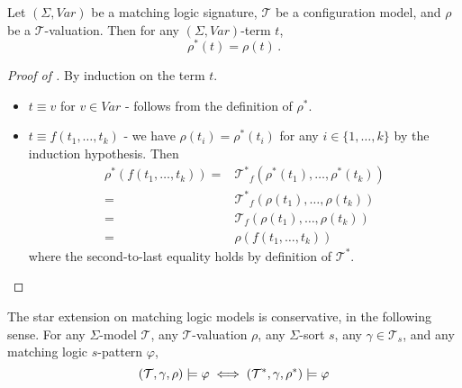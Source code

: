 \begin{lemma}\label{lem:rhoStarOfTerm}
    Let $(\Sigma, \mathit{Var})$ be a matching logic signature, $\mathcal{T}$ be a configuration model,
    and $\rho$ be a $\mathcal{T}$-valuation. Then for any $(\Sigma, \mathit{Var})$-term $t$,
    \begin{equation}
        \rho^*(t) = \rho(t) \, .
    \end{equation}
\end{lemma}

\begin{proof}[Proof of ]
    By induction on the term $t$.
    \begin{itemize}
        \item $t \equiv v$ for $v \in \mathit{Var}$ - follows from the definition of $\rho^*$.
        \item $t \equiv f(t_1, \ldots, t_k)$ - we have $\rho(t_i) = \rho^*(t_i)$ for any $i \in \{ 1, \ldots, k \}$
              by the induction hypothesis.
              Then
              \begin{align*}
                  \rho^*(f(t_1, \ldots, t_k)) 
                  = & {\mathcal{T}^*}_f(\rho^*(t_1), \ldots, \rho^*(t_k)) \\
                  = & {\mathcal{T}^*}_f(\rho(t_1), \ldots, \rho(t_k)) \\
                  = & \mathcal{T}_f(\rho(t_1), \ldots, \rho(t_k)) \\
                  = & \rho(f(t_1, \ldots, t_k))
              \end{align*}
              where the second-to-last equality holds by definition of $\mathcal{T}^*$.
    \end{itemize}
\end{proof}

\begin{lemma}\label{lem:starConservative}
    The star extension on matching logic models is conservative, in the following sense.
    For any $\Sigma$-model $\mathcal{T}$, any $\mathcal{T}$-valuation $\rho$,
    any $\Sigma$-sort $s$,
    any $\gamma \in \mathcal{T}_s$,
    and any matching logic $s$-pattern $\varphi$,
    \begin{equation*}
        (\mathcal{T}, \gamma, \rho) \models \varphi \iff (\mathcal{T}^*, \gamma, \rho^*) \models \varphi
    \end{equation*}
\end{lemma}

